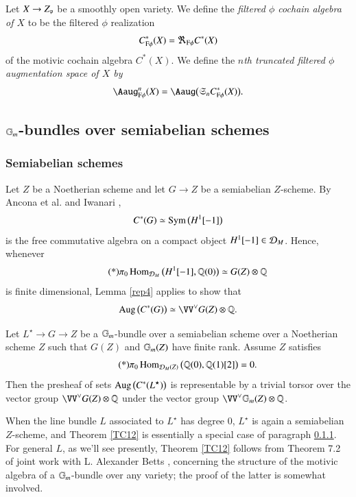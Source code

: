 \begin{ssDefinition}
\label{EA27}
Let $X \to Z_{\mathfrak{p}}$ be a smoothly open variety. We define the \emph{filtered $\phi$ cochain algebra of $X$} to be the filtered $\phi$ realization 
\[
C^*_{\mathrm{F}\phi}(X) = \Re_{\mathrm{F}\phi} C^*(X)
\]
of the motivic cochain algebra $C^*(X)$. We define the \emph{$n$th truncated filtered $\phi$ augmentation space of $X$ by}
\[
\Aaug^n_\Fphi(X) = \Aaug \big(\fkS_n C_\Fphi^*(X)\big).
\]

\end{ssDefinition}


\subsection{${\mathbb{G}_m}$-bundles over semiabelian schemes}
\label{sSec:GmBun}

\subsubsection{Semiabelian schemes}
\label{TC11}
Let $Z$ be a Noetherian scheme and let $G \to Z$ be a semiabelian $Z$-scheme. By Ancona et al. \cite{AnconaHuberII} and Iwanari \cite{Iwanari},
\[
C^*(G) \simeq \operatorname{Sym} \big(H^1[-1]\big)
\]
is the free commutative algebra on a compact object $H^1[-1] \in \mathcal{D}_M$. Hence, whenever 
\[
\tag{*}
\pi_0 \operatorname{Hom}_{\mathcal{D}_M} \big( H^1 [-1], \mathbb{Q}(0) \big) 
\simeq G(Z) \otimes \mathbb{Q}
\]
is finite dimensional, Lemma \ref{rep4} applies to show that 
\[
\Aug \big( C^*(G) \big)
\simeq
\VV^\lor G(Z) \otimes \QQ. 
\]

\begin{ssTheorem}
\label{TC12}
Let $L^\star \to G \to Z$ be a ${\mathbb{G}_m}$-bundle over a semiabelian scheme over a Noetherian scheme $Z$ such that $G(Z)$ and ${\mathbb{G}_m}(Z)$ have finite rank. Assume $Z$ satisfies
\[
\tag{*}
\pi_0\operatorname{Hom}_{\mathcal{D}_M(Z)} \big( \mathbb{Q}(0), \mathbb{Q}(1)[2] \big) = 0.
\]
Then the presheaf of sets $\operatorname{Aug} \big( C^*(L^\star) \big)$ is representable by a trivial torsor over the vector group $\VV^\lor G(Z) \otimes \QQ$ under the vector group $\VV^\lor \Gm(Z)\otimes \QQ$.
\end{ssTheorem}

\begin{ssRemark}
\label{TC13}
When the line bundle $L$ associated to $L^\star$ has degree 0, $L^\star$ is again a semiabelian $Z$-scheme, and Theorem \ref{TC12} is essentially a special case of paragraph \ref{TC11}. For general $L$, as we'll see presently, Theorem \ref{TC12} follows from Theorem 7.2 of joint work with L. Alexander Betts \cite{DCBetts}, concerning the structure of the motivic algebra of a ${\mathbb{G}_m}$-bundle over any variety; the proof of the latter is somewhat involved.
\end{ssRemark}

